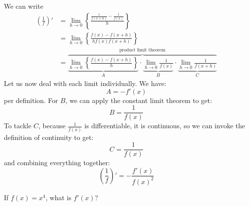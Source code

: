 \begin{itemize}
    \begin{prooof}
        We can write
        \begin{align}
            \left(\frac{1}{f}\right)'&=\lim_{h\to 0} \left\{\frac{\frac{1}{f(x+h)}-\frac{1}{f(x)}}{h}\right\} \\ 
            &= \lim_{h\to 0}\left\{\frac{f(x)-f(x+h)}{hf(x)f(x+h)}\right\} \\ 
            &= \overbrace{\underbrace{\lim_{h\to 0}\left\{\frac{f(x)-f(x+h)}{h}\right\}}_{A}\cdot\underbrace{\lim_{h\to 0} \frac{1}{f(x)}}_B \cdot\underbrace{\lim_{h\to 0} \frac{1}{f(x+h)}}_C}^\text{product limit theorem}
        \end{align}
        Let us now deal with each limit individually. We have:
        \begin{equation}
            A = -f'(x)
            \label{eq:}
        \end{equation}
        per definition. For $B$, we can apply the constant limit theorem to get:
        \begin{equation}
            B = \frac{1}{f(x)}
            \label{eq:}
        \end{equation}
        To tackle $C$, because $\frac{1}{f(x)}$ is differentiable, it is continuous, so we can invoke the definition of continuity to get:
        \begin{equation}
            C=\frac{1}{f(x)}
            \label{eq:}
        \end{equation}
        and combining everything together:
        \begin{equation}
            \left(\frac{1}{f}\right)'=-\frac{f'(x)}{f(x)^2}
            \label{eq:}
        \end{equation}
    \end{prooof}
    \begin{example}
        If $f(x)=x^4$, what is $f'(x)$?
        \vspace{2mm}


\end{example}
\end{itemize}

